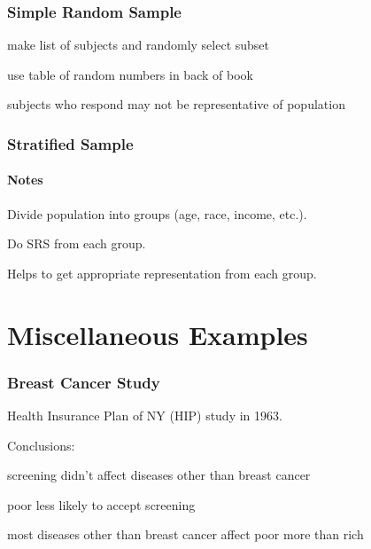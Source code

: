 \documentclass[landscape]{exam}
\begin{document}
  \section{Simple Random Sample}
  \begin{itemize*}
    \item make list of subjects and randomly select subset
    \item use table of random numbers in back of book
    \item subjects who respond may not be representative of population
  \end{itemize*}

  \section{Stratified Sample}
  \subsection{Notes}
  \begin{itemize*}
    \item Divide population into groups (age, race, income, etc.).
    \item Do SRS from each group.
    \item Helps to get appropriate representation from each group.
  \end{itemize*}

  \part{Miscellaneous Examples}
  \section{Breast Cancer Study}
  Health Insurance Plan of NY (HIP) study in 1963.

  Conclusions:
  \begin{itemize*}
    \item screening didn't affect diseases other than breast cancer
    \item poor less likely to accept screening
    \item most diseases other than breast cancer affect poor more than rich
  \end{itemize*}
\end{document}
